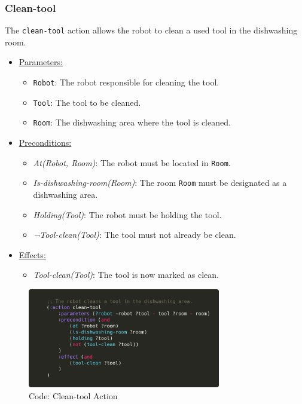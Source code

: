 \documentclass{article}
\begin{document}
\subsubsection{Clean-tool}
The \texttt{clean-tool} action allows the robot to clean a used tool in the dishwashing room.
\begin{itemize}
    \item \underline{Parameters:}
    \begin{itemize}
        \item \texttt{Robot}: The robot responsible for cleaning the tool.
        \item \texttt{Tool}: The tool to be cleaned.
        \item \texttt{Room}: The dishwashing area where the tool is cleaned.
    \end{itemize}
    \item \underline{Preconditions:}
    \begin{itemize}
        \item \textit{At(Robot, Room)}: The robot must be located in \texttt{Room}.
        \item \textit{Is-dishwashing-room(Room)}: The room \texttt{Room} must be designated as a dishwashing area.
        \item \textit{Holding(Tool)}: The robot must be holding the tool.
        \item \textit{¬Tool-clean(Tool)}: The tool must not already be clean.
    \end{itemize}
    \item \underline{Effects:}
    \begin{itemize}
        \item \textit{Tool-clean(Tool)}: The tool is now marked as clean.
    \end{itemize}
\end{itemize}
    \begin{figure}[ht]
    \centering
    \includegraphics[width=0.75\textwidth]{assets/clean-tool.png}
    \caption{Code: Clean-tool Action}
    \label{fig:act:clean-tool}
\end{figure}
\end{document}
